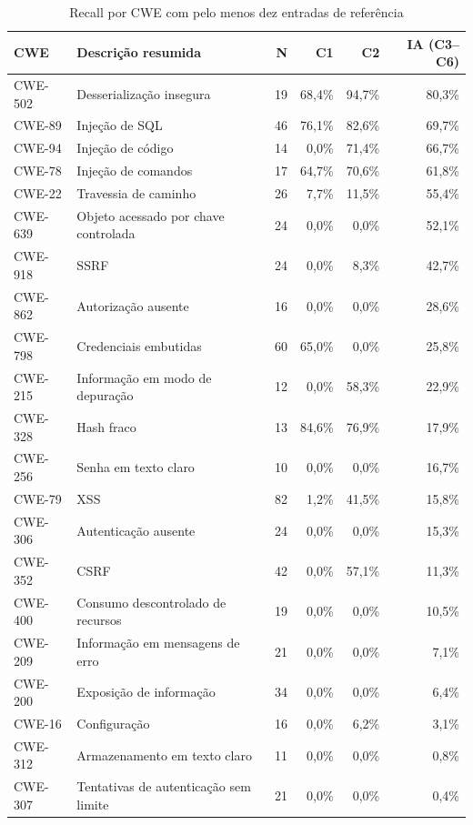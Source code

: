 \begin{table}[htb]
\ABNTEXfontereduzida
\caption{\label{tab:recall-cwe}Recall por CWE com pelo menos dez entradas de referência}
\centering
\begin{tabular}{llrrrr}
\hline
\textbf{CWE} & \textbf{Descrição resumida} & \textbf{N} & \textbf{C1} & \textbf{C2} & \textbf{IA (C3--C6)} \\
\hline
CWE-502 & Desserialização insegura & 19 & 68,4\% & 94,7\% & 80,3\% \\
CWE-89 & Injeção de SQL & 46 & 76,1\% & 82,6\% & 69,7\% \\
CWE-94 & Injeção de código & 14 & 0,0\% & 71,4\% & 66,7\% \\
CWE-78 & Injeção de comandos & 17 & 64,7\% & 70,6\% & 61,8\% \\
CWE-22 & Travessia de caminho & 26 & 7,7\% & 11,5\% & 55,4\% \\
CWE-639 & Objeto acessado por chave controlada & 24 & 0,0\% & 0,0\% & 52,1\% \\
CWE-918 & SSRF & 24 & 0,0\% & 8,3\% & 42,7\% \\
CWE-862 & Autorização ausente & 16 & 0,0\% & 0,0\% & 28,6\% \\
CWE-798 & Credenciais embutidas & 60 & 65,0\% & 0,0\% & 25,8\% \\
CWE-215 & Informação em modo de depuração & 12 & 0,0\% & 58,3\% & 22,9\% \\
CWE-328 & Hash fraco & 13 & 84,6\% & 76,9\% & 17,9\% \\
CWE-256 & Senha em texto claro & 10 & 0,0\% & 0,0\% & 16,7\% \\
CWE-79 & XSS & 82 & 1,2\% & 41,5\% & 15,8\% \\
CWE-306 & Autenticação ausente & 24 & 0,0\% & 0,0\% & 15,3\% \\
CWE-352 & CSRF & 42 & 0,0\% & 57,1\% & 11,3\% \\
CWE-400 & Consumo descontrolado de recursos & 19 & 0,0\% & 0,0\% & 10,5\% \\
CWE-209 & Informação em mensagens de erro & 21 & 0,0\% & 0,0\% & 7,1\% \\
CWE-200 & Exposição de informação & 34 & 0,0\% & 0,0\% & 6,4\% \\
CWE-16 & Configuração & 16 & 0,0\% & 6,2\% & 3,1\% \\
CWE-312 & Armazenamento em texto claro & 11 & 0,0\% & 0,0\% & 0,8\% \\
CWE-307 & Tentativas de autenticação sem limite & 21 & 0,0\% & 0,0\% & 0,4\% \\
\hline
\end{tabular}
\end{table}

